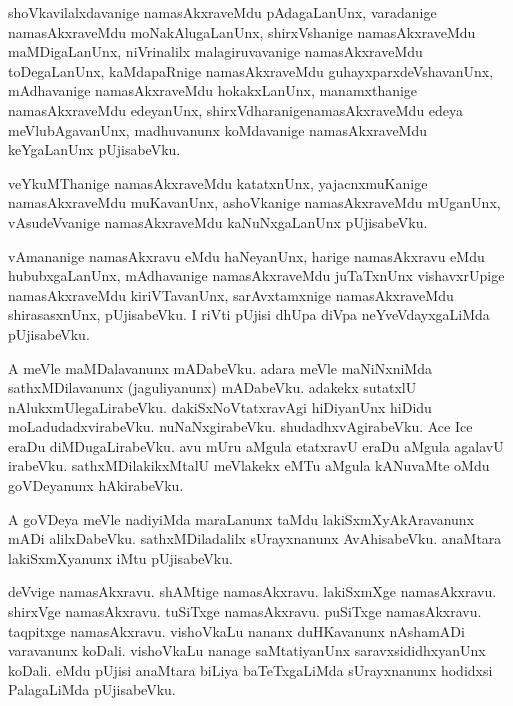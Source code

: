 \documentclass{article}
\begin{document}
\begin{mn}
shoVkavilalxdavanige  namasAkxraveMdu  pAdagaLanUnx,  varadanige  namasAkxraveMdu  
moNakAlugaLanUnx,  shirxVshanige  namasAkxraveMdu  maMDigaLanUnx,  niVrinalilx  
malagiruvavanige  namasAkxraveMdu  toDegaLanUnx,  kaMdapaRnige  namasAkxraveMdu  
guhayxparxdeVshavanUnx,  mAdhavanige  namasAkxraveMdu  hokakxLanUnx,  manamxthanige  
namasAkxraveMdu  edeyanUnx,  shirxVdharanigenamasAkxraveMdu  edeya  meVlubAgavanUnx,  
madhuvanunx  koMdavanige  namasAkxraveMdu  keYgaLanUnx  pUjisabeVku.
\end{mn}

\begin{mn}
veYkuMThanige  namasAkxraveMdu  katatxnUnx,  yajacnxmuKanige  namasAkxraveMdu  muKavanUnx,  
ashoVkanige  namasAkxraveMdu  mUganUnx,  vAsudeVvanige  namasAkxraveMdu  kaNuNxgaLanUnx  pUjisabeVku.
\end{mn}

\begin{mn}
vAmananige  namasAkxravu  eMdu  haNeyanUnx,  harige  namasAkxravu  eMdu  hububxgaLanUnx,  
mAdhavanige  namasAkxraveMdu  juTaTxnUnx  vishavxrUpige  namasAkxraveMdu  kiriVTavanUnx,  
sarAvxtamxnige  namasAkxraveMdu  shirasasxnUnx,  pUjisabeVku.  I riVti  pUjisi  dhUpa  
diVpa  neYveVdayxgaLiMda  pUjisabeVku.
\end{mn}

\begin{mn}
A meVle  maMDalavanunx  mADabeVku.  adara  meVle  maNiNxniMda  sathxMDilavanunx 
(jaguliyanunx) mADabeVku.  adakekx  sutatxlU  nAlukxmUlegaLirabeVku.  dakiSxNoVtatxravAgi  
hiDiyanUnx  hiDidu  moLadudadxvirabeVku.  nuNaNxgirabeVku.  shudadhxvAgirabeVku.  Ace  Ice  
eraDu  diMDugaLirabeVku.  avu  mUru aMgula  etatxravU  eraDu  aMgula  agalavU  irabeVku.  
sathxMDilakikxMtalU  meVlakekx  eMTu  aMgula  kANuvaMte  oMdu  goVDeyanunx  hAkirabeVku.
\end{mn}

\begin{mn}
A  goVDeya  meVle  nadiyiMda  maraLanunx  taMdu  lakiSxmXyAkAravanunx  mADi  alilxDabeVku.  
sathxMDiladalilx  sUrayxnanunx  AvAhisabeVku.  anaMtara   lakiSxmXyanunx  iMtu  pUjisabeVku.
\end{mn}

\begin{mn}
deVvige  namasAkxravu.  shAMtige  namasAkxravu.  lakiSxmXge namasAkxravu.  shirxVge  namasAkxravu.  
tuSiTxge  namasAkxravu.  puSiTxge  namasAkxravu.  taqpitxge  namasAkxravu.  vishoVkaLu  nananx  
duHKavanunx  nAshamADi  varavanunx  koDali.  vishoVkaLu  nanage  saMtatiyanUnx  saravxsididhxyanUnx  
koDali.  eMdu  pUjisi  anaMtara  biLiya  baTeTxgaLiMda  sUrayxnanunx  hodidxsi  PalagaLiMda  pUjisabeVku.
\end{mn}
\end{document}
